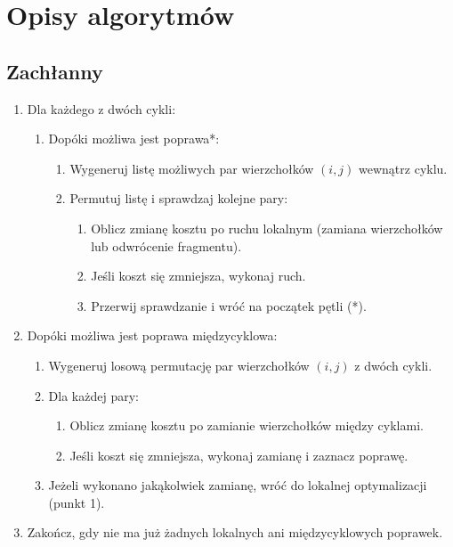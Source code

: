 \documentclass[11pt]{article}
\begin{document}
\section{Opisy algorytmów}\label{sec:opisy-alg}

\subsection{Zachłanny}\label{subsec:zachanny}

\begin{enumerate}
    \item Dla każdego z dwóch cykli:
    \begin{enumerate}
        \item Dopóki możliwa jest poprawa*:
        \begin{enumerate}
            \item Wygeneruj listę możliwych par wierzchołków $(i, j)$ wewnątrz cyklu.
            \item Permutuj listę i sprawdzaj kolejne pary:
            \begin{enumerate}
                \item Oblicz zmianę kosztu po ruchu lokalnym (zamiana wierzchołków lub odwrócenie fragmentu).
                \item Jeśli koszt się zmniejsza, wykonaj ruch.
                \item Przerwij sprawdzanie i wróć na początek pętli (*).
            \end{enumerate}
        \end{enumerate}
    \end{enumerate}

    \item Dopóki możliwa jest poprawa międzycyklowa:
    \begin{enumerate}
        \item Wygeneruj losową permutację par wierzchołków $(i, j)$ z dwóch cykli.
        \item Dla każdej pary:
        \begin{enumerate}
            \item Oblicz zmianę kosztu po zamianie wierzchołków między cyklami.
            \item Jeśli koszt się zmniejsza, wykonaj zamianę i zaznacz poprawę.
        \end{enumerate}
        \item Jeżeli wykonano jakąkolwiek zamianę, wróć do lokalnej optymalizacji (punkt 1).
    \end{enumerate}

    \item Zakończ, gdy nie ma już żadnych lokalnych ani międzycyklowych poprawek.
\end{enumerate}
\end{document}

